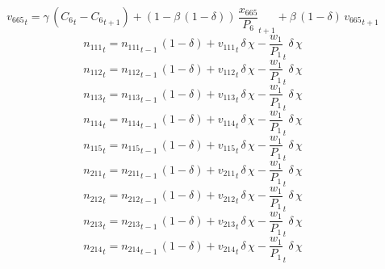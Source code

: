 \begin{dmath}
{{v_{665}}}_{t}={{\gamma}}\, \left({{C_{6}}}_{t}-{{C_{6}}}_{t+1}\right)+\left(1-{{\beta}}\, \left(1-{{\delta}}\right)\right)\, {{\frac{x_{665}}{P_{6}}}}_{t+1}+{{\beta}}\, \left(1-{{\delta}}\right)\, {{v_{665}}}_{t+1}
\end{dmath}
\begin{dmath}
{{n_{111}}}_{t}={{n_{111}}}_{t-1}\, \left(1-{{\delta}}\right)+{{v_{111}}}_{t}\, {{\delta}}\, {{\chi}}-{{\frac{w_{1}}{P_{1}}}}_{t}\, {{\delta}}\, {{\chi}}
\end{dmath}
\begin{dmath}
{{n_{112}}}_{t}={{n_{112}}}_{t-1}\, \left(1-{{\delta}}\right)+{{v_{112}}}_{t}\, {{\delta}}\, {{\chi}}-{{\frac{w_{1}}{P_{1}}}}_{t}\, {{\delta}}\, {{\chi}}
\end{dmath}
\begin{dmath}
{{n_{113}}}_{t}={{n_{113}}}_{t-1}\, \left(1-{{\delta}}\right)+{{v_{113}}}_{t}\, {{\delta}}\, {{\chi}}-{{\frac{w_{1}}{P_{1}}}}_{t}\, {{\delta}}\, {{\chi}}
\end{dmath}
\begin{dmath}
{{n_{114}}}_{t}={{n_{114}}}_{t-1}\, \left(1-{{\delta}}\right)+{{v_{114}}}_{t}\, {{\delta}}\, {{\chi}}-{{\frac{w_{1}}{P_{1}}}}_{t}\, {{\delta}}\, {{\chi}}
\end{dmath}
\begin{dmath}
{{n_{115}}}_{t}={{n_{115}}}_{t-1}\, \left(1-{{\delta}}\right)+{{v_{115}}}_{t}\, {{\delta}}\, {{\chi}}-{{\frac{w_{1}}{P_{1}}}}_{t}\, {{\delta}}\, {{\chi}}
\end{dmath}
\begin{dmath}
{{n_{211}}}_{t}={{n_{211}}}_{t-1}\, \left(1-{{\delta}}\right)+{{v_{211}}}_{t}\, {{\delta}}\, {{\chi}}-{{\frac{w_{1}}{P_{1}}}}_{t}\, {{\delta}}\, {{\chi}}
\end{dmath}
\begin{dmath}
{{n_{212}}}_{t}={{n_{212}}}_{t-1}\, \left(1-{{\delta}}\right)+{{v_{212}}}_{t}\, {{\delta}}\, {{\chi}}-{{\frac{w_{1}}{P_{1}}}}_{t}\, {{\delta}}\, {{\chi}}
\end{dmath}
\begin{dmath}
{{n_{213}}}_{t}={{n_{213}}}_{t-1}\, \left(1-{{\delta}}\right)+{{v_{213}}}_{t}\, {{\delta}}\, {{\chi}}-{{\frac{w_{1}}{P_{1}}}}_{t}\, {{\delta}}\, {{\chi}}
\end{dmath}
\begin{dmath}
{{n_{214}}}_{t}={{n_{214}}}_{t-1}\, \left(1-{{\delta}}\right)+{{v_{214}}}_{t}\, {{\delta}}\, {{\chi}}-{{\frac{w_{1}}{P_{1}}}}_{t}\, {{\delta}}\, {{\chi}}
\end{dmath}
